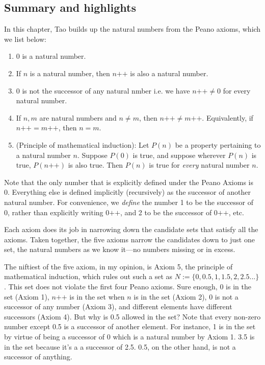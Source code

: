 \documentclass{article}
\newcommand{\pp}{{\texttt{++}}}
\begin{document}
\subsection*{Summary and highlights}
In this chapter, Tao builds up the natural numbers from the Peano axioms, which we list below:
\begin{enumerate}
    \item 0 is a natural number.
    \item If $n$ is a natural number, then $n\pp$ is also a natural number.
    \item 0 is not the successor of any natural nmber i.e. we have $n\pp \neq 0$ for every natural number.
    \item If $n,m$ are natural numbers and $n \neq m$, then $n\pp \neq m\pp$. Equivalently, if $n \pp = m \pp$, then $n = m$.
    \item (Principle of mathematical induction): Let $P(n)$ be a property pertaining to a natural number $n$. Suppose $P(0)$ is true, and suppose wherever $P(n)$ is true, $P(n\pp)$ is also true. Then $P(n)$ is true for \textit{every} natural number $n$. 
\end{enumerate}

Note that the only number that is explicitly defined under the Peano Axioms is 0. Everything else is defined implicitly (recursively) as the successor of another natural number. For convenience, we \textit{define} the number 1 to be the successor of 0, rather than explicitly writing $0\pp$, and 2 to be the successor of $0 \pp$, etc.


Each axiom does its job in narrowing down the candidate sets that satisfy all the axioms. Taken together, the five axioms narrow the candidates down to just one set, the natural numbers as we know it---no numbers missing or in excess. 

The niftiest of the five axiom, in my opinion, is Axiom 5, the principle of mathematical induction, which rules out such a set as $N := \{ 0, 0.5, 1, 1.5, 2, 2.5 ... \}$. This set does not violate the first four Peano axioms. Sure enough, 0 is in the set (Axiom 1), $n\pp$ is in the set when $n$ is in the set (Axiom 2), 0 is not a successor of any number (Axiom 3), and different elements have different successors (Axiom 4). But why is 0.5 allowed in the set? Note that every non-zero number except 0.5 is a successor of another element. For instance, 1 is in the set by virtue of being a successor of 0 which is a natural number by Axiom 1. 3.5 is in the set because it's a a successor of 2.5. 0.5, on the other hand, is not a successor of anything.
\end{document}
